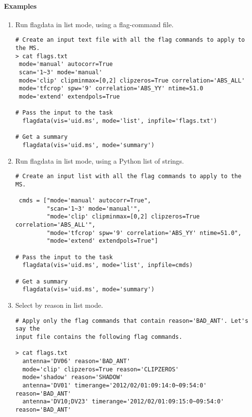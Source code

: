 \paragraph{Examples}

\begin{enumerate}
\item Run flagdata in list mode, using a flag-command file.

\begin{verbatim}
# Create an input text file with all the flag commands to apply to the MS.
> cat flags.txt
 mode='manual' autocorr=True
 scan='1~3' mode='manual'
 mode='clip' clipminmax=[0,2] clipzeros=True correlation='ABS_ALL'
 mode='tfcrop' spw='9' correlation='ABS_YY' ntime=51.0
 mode='extend' extendpols=True

# Pass the input to the task
  flagdata(vis='uid.ms', mode='list', inpfile='flags.txt')
 
# Get a summary
  flagdata(vis='uid.ms', mode='summary')

\end{verbatim}

\item Run flagdata in list mode, using a Python list of strings.

\begin{verbatim}
# Create an input list with all the flag commands to apply to the MS.

 cmds = ["mode='manual' autocorr=True",
         "scan='1~3' mode='manual'",
         "mode='clip' clipminmax=[0,2] clipzeros=True correlation='ABS_ALL'",
         "mode='tfcrop' spw='9' correlation='ABS_YY' ntime=51.0",
         "mode='extend' extendpols=True"]

# Pass the input to the task
  flagdata(vis='uid.ms', mode='list', inpfile=cmds)
 
# Get a summary
  flagdata(vis='uid.ms', mode='summary')

\end{verbatim}


\item Select by reason in list mode.

\begin{verbatim}
# Apply only the flag commands that contain reason='BAD_ANT'. Let's say the
input file contains the following flag commands.

> cat flags.txt
  antenna='DV06' reason='BAD_ANT'
  mode='clip' clipzeros=True reason='CLIPZEROS'
  mode='shadow' reason='SHADOW'
  antenna='DV01' timerange='2012/02/01:09:14:0~09:54:0' reason='BAD_ANT'
  antenna='DV10;DV23' timerange='2012/02/01:09:15:0~09:54:0' reason='BAD_ANT'
  

\end{verbatim}
\end{enumerate}
